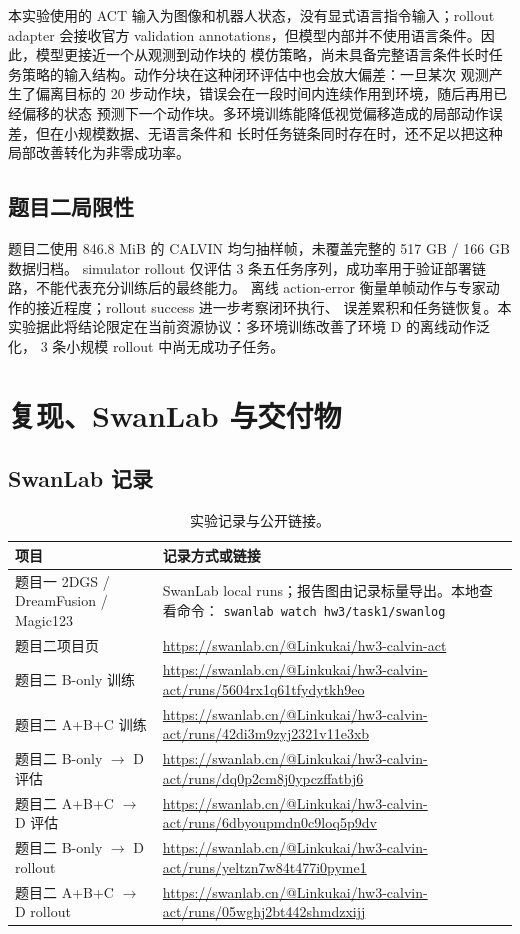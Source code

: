 \documentclass[10pt,a4paper,UTF8,fontset=windows]{ctexart}
\newcommand{\code}[1]{\texttt{\small #1}}
\begin{document}
本实验使用的 ACT 输入为图像和机器人状态，没有显式语言指令输入；rollout adapter 会接收官方
validation annotations，但模型内部并不使用语言条件。因此，模型更接近一个从观测到动作块的
模仿策略，尚未具备完整语言条件长时任务策略的输入结构。动作分块在这种闭环评估中也会放大偏差：一旦某次
观测产生了偏离目标的 20 步动作块，错误会在一段时间内连续作用到环境，随后再用已经偏移的状态
预测下一个动作块。多环境训练能降低视觉偏移造成的局部动作误差，但在小规模数据、无语言条件和
长时任务链条同时存在时，还不足以把这种局部改善转化为非零成功率。

\subsection{题目二局限性}

题目二使用 846.8 MiB 的 CALVIN 均匀抽样帧，未覆盖完整的 517 GB / 166 GB 数据归档。
simulator rollout 仅评估 3 条五任务序列，成功率用于验证部署链路，不能代表充分训练后的最终能力。
离线 action-error 衡量单帧动作与专家动作的接近程度；rollout success 进一步考察闭环执行、
误差累积和任务链恢复。本实验据此将结论限定在当前资源协议：多环境训练改善了环境 D 的离线动作泛化，
3 条小规模 rollout 中尚无成功子任务。

\clearpage
\onecolumn
\section{复现、SwanLab 与交付物}

\subsection{SwanLab 记录}

\begin{table}[H]
\centering
\caption{实验记录与公开链接。}
\label{tab:swanlab}
\small
\begin{tabularx}{0.98\textwidth}{p{3.8cm}Y}
\toprule
项目 & 记录方式或链接 \\
\midrule
题目一 2DGS / DreamFusion / Magic123 &
SwanLab local runs；报告图由记录标量导出。本地查看命令：
\code{swanlab watch hw3/task1/swanlog} \\
题目二项目页 &
\url{https://swanlab.cn/@Linkukai/hw3-calvin-act} \\
题目二 B-only 训练 &
\url{https://swanlab.cn/@Linkukai/hw3-calvin-act/runs/5604rx1q61tfydytkh9eo} \\
题目二 A+B+C 训练 &
\url{https://swanlab.cn/@Linkukai/hw3-calvin-act/runs/42di3m9zyj2321v11e3xb} \\
题目二 B-only $\rightarrow$ D 评估 &
\url{https://swanlab.cn/@Linkukai/hw3-calvin-act/runs/dq0p2cm8j0ypczffatbj6} \\
题目二 A+B+C $\rightarrow$ D 评估 &
\url{https://swanlab.cn/@Linkukai/hw3-calvin-act/runs/6dbyoupmdn0c9loq5p9dv} \\
题目二 B-only $\rightarrow$ D rollout &
\url{https://swanlab.cn/@Linkukai/hw3-calvin-act/runs/yeltzn7w84t477i0pyme1} \\
题目二 A+B+C $\rightarrow$ D rollout &
\url{https://swanlab.cn/@Linkukai/hw3-calvin-act/runs/05wghj2bt442shmdzxijj} \\
\bottomrule
\end{tabularx}
\end{table}
\end{document}
